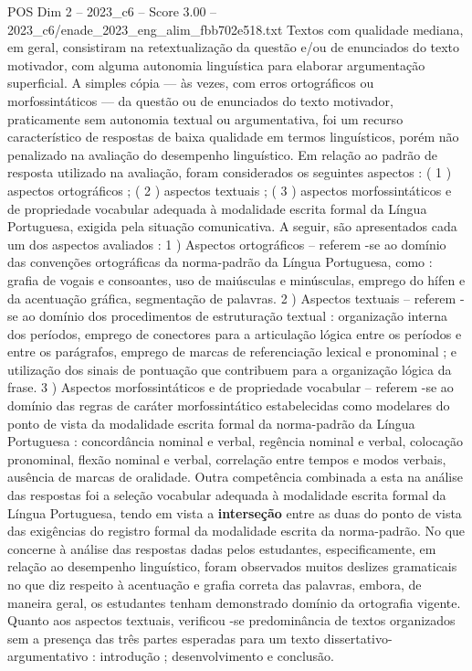 \begin{textsample}{POS Dim 2 – 2023\_c6 – Score 3.00 – 2023\_c6/enade\_2023\_eng\_alim\_fbb702e518.txt}
Textos com qualidade mediana, em geral, consistiram na retextualização da questão e/ou de enunciados do texto motivador, com alguma autonomia linguística para elaborar argumentação superficial.
A simples cópia — às vezes, com erros ortográficos ou morfossintáticos — da questão ou de enunciados do texto motivador, praticamente sem autonomia textual ou argumentativa, foi um recurso característico de respostas de baixa qualidade em termos linguísticos, porém não penalizado na avaliação do desempenho linguístico.
Em relação ao padrão de resposta utilizado na avaliação, foram considerados os seguintes aspectos : ( 1 ) aspectos ortográficos ; ( 2 ) aspectos textuais ; ( 3 ) aspectos morfossintáticos e de propriedade vocabular adequada à modalidade escrita formal da Língua Portuguesa, exigida pela situação comunicativa.
A seguir, são apresentados cada um dos aspectos avaliados : 1 ) Aspectos ortográficos – referem -se ao domínio das convenções ortográficas da norma-padrão da Língua Portuguesa, como : grafia de vogais e consoantes, uso de maiúsculas e minúsculas, emprego do hífen e da acentuação gráfica, segmentação de palavras. 2 ) Aspectos textuais – referem -se ao domínio dos procedimentos de estruturação textual : organização interna dos períodos, emprego de conectores para a articulação lógica entre os períodos e entre os parágrafos, emprego de marcas de referenciação lexical e pronominal ; e utilização dos sinais de pontuação que contribuem para a organização lógica da frase. 3 ) Aspectos morfossintáticos e de propriedade vocabular – referem -se ao domínio das regras de caráter morfossintático estabelecidas como modelares do ponto de vista da modalidade escrita formal da norma-padrão da Língua Portuguesa : concordância nominal e verbal, regência nominal e verbal, colocação pronominal, flexão nominal e verbal, correlação entre tempos e modos verbais, ausência de marcas de oralidade.
Outra competência combinada a esta na análise das respostas foi a seleção vocabular adequada à modalidade escrita formal da Língua Portuguesa, tendo em vista a \textbf{interseção} entre as duas do ponto de vista das exigências do registro formal da modalidade escrita da norma-padrão.
No que concerne à análise das respostas dadas pelos estudantes, especificamente, em relação ao desempenho linguístico, foram observados muitos deslizes gramaticais no que diz respeito à acentuação e grafia correta das palavras, embora, de maneira geral, os estudantes tenham demonstrado domínio da ortografia vigente.
Quanto aos aspectos textuais, verificou -se predominância de textos organizados sem a presença das três partes esperadas para um texto dissertativo-argumentativo : introdução ; desenvolvimento e conclusão.

\end{textsample}
